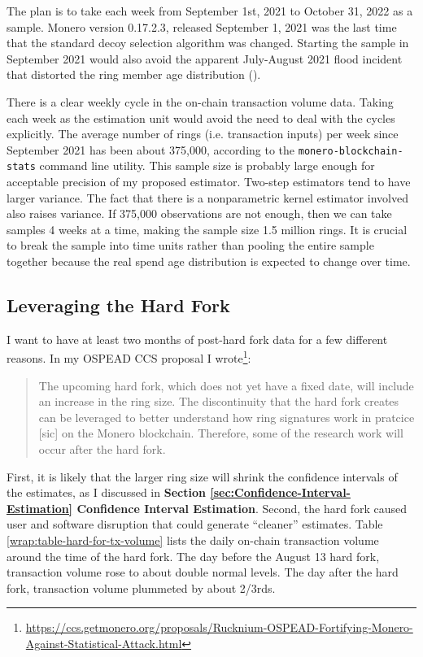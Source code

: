 \documentclass[english]{article}
\begin{document}
The plan is to take each week from September 1st, 2021 to October
31, 2022 as a sample. Monero version 0.17.2.3, released September
1, 2021 was the last time that the standard decoy selection algorithm
was changed. Starting the sample in September 2021 would also avoid
the apparent July-August 2021 flood incident that distorted the ring
member age distribution (\cite{Krawiec-Thayer2021}).

There is a clear weekly cycle in the on-chain transaction volume data.
Taking each week as the estimation unit would avoid the need to deal
with the cycles explicitly. The average number of rings (i.e. transaction
inputs) per week since September 2021 has been about 375,000, according
to the \texttt{monero-blockchain-stats} command line utility. This
sample size is probably large enough for acceptable precision of my
proposed estimator. Two-step estimators tend to have larger variance.
The fact that there is a nonparametric kernel estimator involved also
raises variance. If 375,000 observations are not enough, then we can
take samples 4 weeks at a time, making the sample size 1.5 million
rings. It is crucial to break the sample into time units rather than
pooling the entire sample together because the real spend age distribution
is expected to change over time.

\subsection{Leveraging the Hard Fork}

I want to have at least two months of post-hard fork data for a few
different reasons. In my OSPEAD CCS proposal I wrote\footnote{\href{https://ccs.getmonero.org/proposals/Rucknium-OSPEAD-Fortifying-Monero-Against-Statistical-Attack.html}{https://ccs.getmonero.org/proposals/Rucknium-OSPEAD-Fortifying-Monero-Against-Statistical-Attack.html}}: 
\begin{quote}
The upcoming hard fork, which does not yet have a fixed date, will
include an increase in the ring size. The discontinuity that the hard
fork creates can be leveraged to better understand how ring signatures
work in pratcice {[}sic{]} on the Monero blockchain. Therefore, some
of the research work will occur after the hard fork.
\end{quote}
First, it is likely that the larger ring size will shrink the confidence
intervals of the estimates, as I discussed in \textbf{Section \ref{sec:Confidence-Interval-Estimation}
Confidence Interval Estimation}. Second, the hard fork caused user
and software disruption that could generate ``cleaner'' estimates.
Table \ref{wrap:table-hard-for-tx-volume} lists the daily on-chain
transaction volume around the time of the hard fork. The day before
the August 13 hard fork, transaction volume rose to about double normal
levels. The day after the hard fork, transaction volume plummeted
by about 2/3rds.
\end{document}
